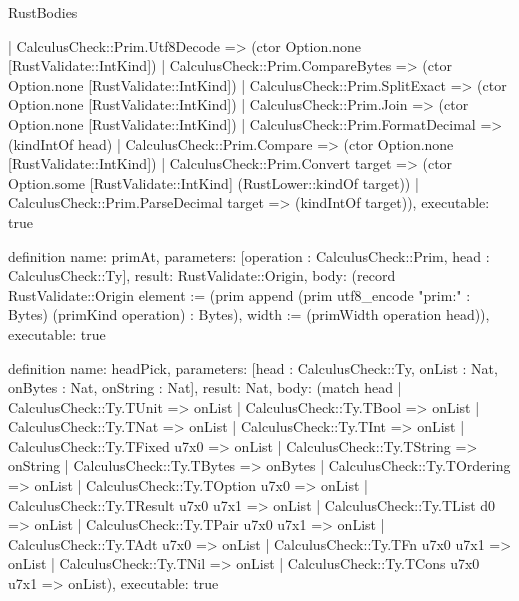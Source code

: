 \begin{lexlean}{RustBodies}
\begin{semanticmodule}
{    | CalculusCheck::Prim.Utf8Decode => (ctor Option.none [RustValidate::IntKind])
    | CalculusCheck::Prim.CompareBytes => (ctor Option.none [RustValidate::IntKind])
    | CalculusCheck::Prim.SplitExact => (ctor Option.none [RustValidate::IntKind])
    | CalculusCheck::Prim.Join => (ctor Option.none [RustValidate::IntKind])
    | CalculusCheck::Prim.FormatDecimal => (kindIntOf head)
    | CalculusCheck::Prim.Compare => (ctor Option.none [RustValidate::IntKind])
    | CalculusCheck::Prim.Convert target => (ctor Option.some [RustValidate::IntKind] (RustLower::kindOf target))
    | CalculusCheck::Prim.ParseDecimal target => (kindIntOf target)),
  executable: true
}

definition{
  name: primAt,
  parameters: [operation : CalculusCheck::Prim, head : CalculusCheck::Ty],
  result: RustValidate::Origin,
  body: (record RustValidate::Origin {element := (prim append (prim utf8_encode "prim:" : Bytes) (primKind operation) : Bytes), width := (primWidth operation head)}),
  executable: true
}

definition{
  name: headPick,
  parameters: [head : CalculusCheck::Ty, onList : Nat, onBytes : Nat, onString : Nat],
  result: Nat,
  body: (match head
    | CalculusCheck::Ty.TUnit => onList
    | CalculusCheck::Ty.TBool => onList
    | CalculusCheck::Ty.TNat => onList
    | CalculusCheck::Ty.TInt => onList
    | CalculusCheck::Ty.TFixed u7x0 => onList
    | CalculusCheck::Ty.TString => onString
    | CalculusCheck::Ty.TBytes => onBytes
    | CalculusCheck::Ty.TOrdering => onList
    | CalculusCheck::Ty.TOption u7x0 => onList
    | CalculusCheck::Ty.TResult u7x0 u7x1 => onList
    | CalculusCheck::Ty.TList d0 => onList
    | CalculusCheck::Ty.TPair u7x0 u7x1 => onList
    | CalculusCheck::Ty.TAdt u7x0 => onList
    | CalculusCheck::Ty.TFn u7x0 u7x1 => onList
    | CalculusCheck::Ty.TNil => onList
    | CalculusCheck::Ty.TCons u7x0 u7x1 => onList),
  executable: true
}


\end{semanticmodule}
\end{lexlean}

